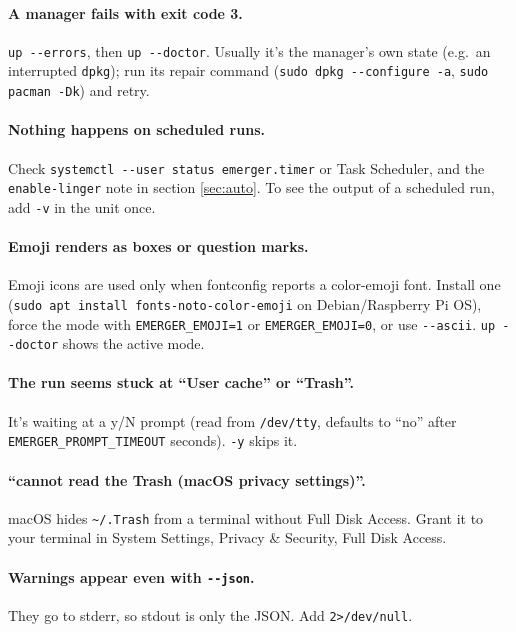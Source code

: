 \documentclass[11pt,a4paper]{article}
\begin{document}
\paragraph{A manager fails with exit code 3.}
\texttt{up -{}-errors}, then \texttt{up -{}-doctor}. Usually it's the
manager's own state (e.g.\ an interrupted \texttt{dpkg}); run its repair
command (\texttt{sudo dpkg -{}-configure -a}, \texttt{sudo pacman -Dk})
and retry.

\paragraph{Nothing happens on scheduled runs.}
Check \texttt{systemctl -{}-user status emerger.timer} or Task Scheduler,
and the \texttt{enable-linger} note in section \ref{sec:auto}. To see the
output of a scheduled run, add \texttt{-v} in the unit once.

\paragraph{Emoji renders as boxes or question marks.}
Emoji icons are used only when fontconfig reports a color-emoji font.
Install one (\texttt{sudo apt install fonts-noto-color-emoji} on
Debian/Raspberry Pi OS), force the mode with \verb|EMERGER_EMOJI=1| or
\verb|EMERGER_EMOJI=0|, or use \texttt{-{}-ascii}.
\texttt{up -{}-doctor} shows the active mode.

\paragraph{The run seems stuck at ``User cache'' or ``Trash''.}
It's waiting at a y/N prompt (read from \verb|/dev/tty|, defaults to
``no'' after \verb|EMERGER_PROMPT_TIMEOUT| seconds). \texttt{-y} skips it.

\paragraph{``cannot read the Trash (macOS privacy settings)''.}
macOS hides \verb|~/.Trash| from a terminal without Full Disk Access.
Grant it to your terminal in System Settings, Privacy \& Security, Full
Disk Access.

\paragraph{Warnings appear even with \texttt{-{}-json}.}
They go to stderr, so stdout is only the JSON. Add \verb|2>/dev/null|.
\end{document}
